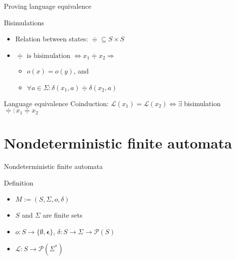 \documentclass[compress]{beamer}
\begin{document}
\begin{frame}{Proving language equivalence}
  \begin{block}{Bisimulations}
    \begin{itemize}
      \item Relation between states: $\doteqdot \subseteq S \times S$
      \item $\doteqdot \text{ is bisimulation } \Leftrightarrow x_1 \doteqdot x_2 \Rightarrow $
        \begin{itemize}
          \item $o(x) = o(y)$, and
          \item $\forall a \in \Sigma: \delta(x_1, a) \doteqdot \delta(x_2, a)$
        \end{itemize}
    \end{itemize}
   \end{block}

   \begin{block}{Language equivalence}
     Coinduction:
     $\mathcal{L}(x_1) = \mathcal{L}(x_2) \Leftrightarrow \exists$ bisimulation $\doteqdot: x_1 \doteqdot x_2$
   \end{block}
\end{frame}

\section{Nondeterministic finite automata}

\begin{frame}{Nondeterministic finite automata}
  \begin{block}{Definition}
    \begin{itemize}
      \item $M := (S, \Sigma, o, \delta)$
      \item $S$ and $\Sigma$ are finite sets
      \item $o : S \to \{\emptyset, \mathbf{\epsilon} \}$,
            $\delta : S \to \Sigma \to \mathcal{P}(S)$
      \item $\mathcal{L} : S \to \mathcal{P}(\Sigma^\ast)$
    \end{itemize}
  \end{block}
\end{frame}
\end{document}
